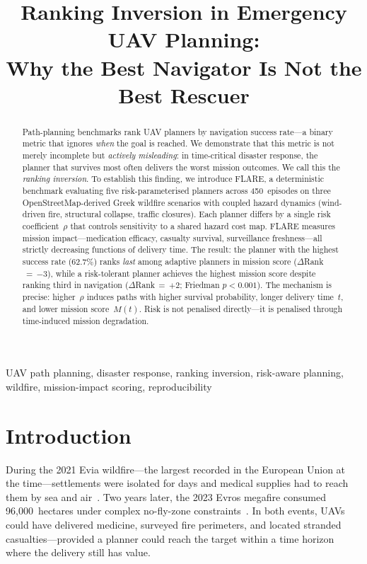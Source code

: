 \documentclass[conference]{IEEEtran}
\title{Ranking Inversion in Emergency UAV Planning:\\
       Why the Best Navigator Is Not the Best Rescuer}
\author{%
  \IEEEauthorblockN{Konstantinos~Zervakis\IEEEauthorrefmark{1}
    \and Elias~Panagiotopoulos\IEEEauthorrefmark{1}}
  \IEEEauthorblockA{\IEEEauthorrefmark{1}Athens, Greece}
}
\begin{document}
\maketitle

\begin{abstract}
Path-planning benchmarks rank UAV planners by navigation success rate---a
binary metric that ignores \emph{when} the goal is reached. We demonstrate
that this metric is not merely incomplete but \emph{actively misleading}:
in time-critical disaster response, the planner that survives most often
delivers the worst mission outcomes. We call this the \emph{ranking
inversion}. To establish this finding, we introduce FLARE, a deterministic
benchmark evaluating five risk-parameterised planners across
450~episodes on three OpenStreetMap-derived Greek wildfire scenarios with
coupled hazard dynamics (wind-driven fire, structural collapse, traffic
closures). Each planner differs by a single risk coefficient~$\rho$ that
controls sensitivity to a shared hazard cost map. FLARE measures mission
impact---medication efficacy, casualty survival, surveillance
freshness---all strictly decreasing functions of delivery time. The result:
the planner with the highest success rate (62.7\%) ranks \emph{last} among
adaptive planners in mission score ($\Delta$Rank$\,{=}\,{-3}$), while a
risk-tolerant planner achieves the highest mission score despite ranking
third in navigation ($\Delta$Rank$\,{=}\,{+2}$; Friedman $p < 0.001$).
The mechanism is precise: higher~$\rho$ induces paths with higher survival probability, longer
delivery time~$t$, and lower mission score~$M(t)$. Risk is not penalised directly---it is
penalised through time-induced mission degradation.
\end{abstract}

\begin{IEEEkeywords}
UAV path planning, disaster response, ranking inversion, risk-aware
planning, wildfire, mission-impact scoring, reproducibility
\end{IEEEkeywords}

\section{Introduction}\label{sec:intro}

During the 2021 Evia wildfire---the largest recorded in the European Union
at the time---settlements were isolated for days and medical supplies had to
reach them by sea and air~\cite{Erdelj2017,Rahim2025}. Two years later, the
2023 Evros megafire consumed 96{,}000~hectares under complex no-fly-zone
constraints~\cite{copernicus_emsn166,effis2023}. In both events, UAVs could
have delivered medicine, surveyed fire perimeters, and located stranded
casualties---provided a planner could reach the target within a time horizon where
the delivery still has value.
\end{document}
